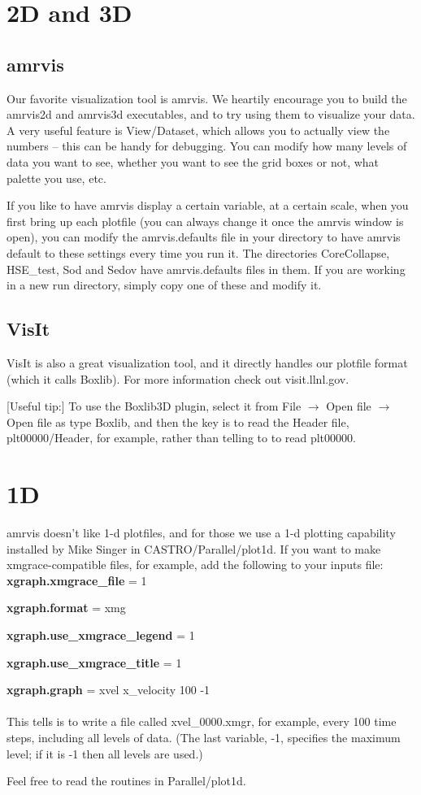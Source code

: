 \section{2D and 3D}
\subsection{amrvis}
Our favorite visualization tool is amrvis. We heartily encourage you to build the amrvis2d and amrvis3d executables, and to try using them to visualize your data. A very useful feature is View/Dataset, which allows you to actually view the numbers -- this can be handy for debugging. You can modify how many levels of data you want to see, whether you want to see the grid boxes or not, what palette you use, etc.

If you like to have amrvis display a certain variable, at a certain scale, when you first bring up each plotfile (you can always change it once the amrvis window is open), you can modify the amrvis.defaults file in your directory to have amrvis default to these settings every time you run it. The directories CoreCollapse, HSE\_test, Sod and Sedov have amrvis.defaults files in them. If you are working in a new run directory, simply copy one of these and modify it.
\subsection{VisIt}
VisIt is also a great visualization tool, and it directly handles our plotfile format (which it calls Boxlib).  For more information check out visit.llnl.gov.

[Useful tip:] To use the Boxlib3D plugin, select it from File $\rightarrow$ Open file $\rightarrow$ Open file as type Boxlib, and then the key is to read the Header file, plt00000/Header, for example, rather than telling to to read plt00000.
\section{1D}
amrvis doesn't like 1-d plotfiles, and for those we use a 1-d plotting capability installed by Mike Singer in CASTRO/Parallel/plot1d.  If you want to make xmgrace-compatible files, for example, add the following to your inputs file:\\

{\bf xgraph.xmgrace\_file} = 1

{\bf xgraph.format} = xmg

{\bf xgraph.use\_xmgrace\_legend} = 1

{\bf xgraph.use\_xmgrace\_title} = 1

{\bf xgraph.graph} = xvel x\_velocity 100 -1\\ \\
This tells is to write a file called xvel\_0000.xmgr, for example, every 100 time steps, including all levels of data. (The last variable, -1, specifies the maximum level; if it is -1 then all levels are used.)

Feel free to read the routines in Parallel/plot1d.
